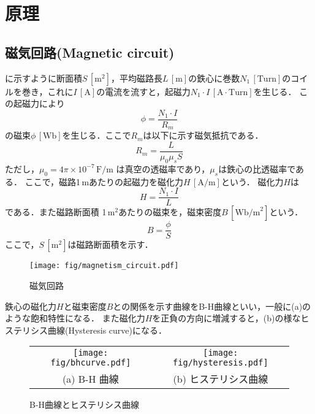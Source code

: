 \clearpage

\section{原理}
\subsection{磁気回路(Magnetic circuit)}
に示すように断面積$S\,[\mathrm{m}^2]$，平均磁路長$L\,[\mathrm{m}]$の鉄心に巻数$N_1\,[\mathrm{Turn}]$のコイルを巻き，これに$I\,[\mathrm{A}]$の電流を流すと，起磁力$N_1\cdot I\,[\mathrm{A}\cdot\mathrm{Turn}]$を生じる．
この起磁力により
\begin{equation}
	\phi = \frac{N_1\cdot I}{R_m}
\end{equation}
の磁束$\phi\,[\mathrm{Wb}]$を生じる．ここで$R_m$は以下に示す磁気抵抗である．
\begin{equation}
	R_m= \frac{L}{\mu_0 \mu_s S}
\end{equation}
ただし，$\mu_0 = 4\pi\times 10^{-7}\,\mathrm{F/m}$ は真空の透磁率であり，$\mu_s$は鉄心の比透磁率である．
ここで，磁路1\,mあたりの起磁力を磁化力$H\,[\mathrm{A/m}]$という． 磁化力$H$は
\begin{equation}
	H=\frac{N_1\cdot I}{L}
\end{equation}
である．また磁路断面積 1\,m$^2$あたりの磁束を，磁束密度$B\,[\mathrm{Wb/m}^2]$という．
\begin{equation}
	B=\frac{\phi}{S}
	\label{eq:hys:BphiS}
\end{equation}
ここで，$S\,[\mathrm{m}^2]$は磁路断面積を示す．
\begin{figure}[htbp]
	\centering
	\texttt{[image: fig/magnetism\_circuit.pdf]}
	\caption{磁気回路}
	\label{fig:hys:jikikairo}
\end{figure}

鉄心の磁化力$H$と磁束密度$B$との関係を示す曲線をB-H曲線といい，一般に(a)のような飽和特性になる．
また磁化力$H$を正負の方向に増減すると，(b)の様なヒステリシス曲線(Hysteresis curve)になる．
\begin{figure}[htbp]
	\centering
	\begin{tabular}{cc}
		\texttt{[image: fig/bhcurve.pdf]} &
		\texttt{[image: fig/hysteresis.pdf]} \\
		(a) B-H 曲線 & (b) ヒステリシス曲線
	\end{tabular}
	\caption{B-H曲線とヒステリシス曲線}
	\label{fig:hys:bhcurve}
\end{figure}

